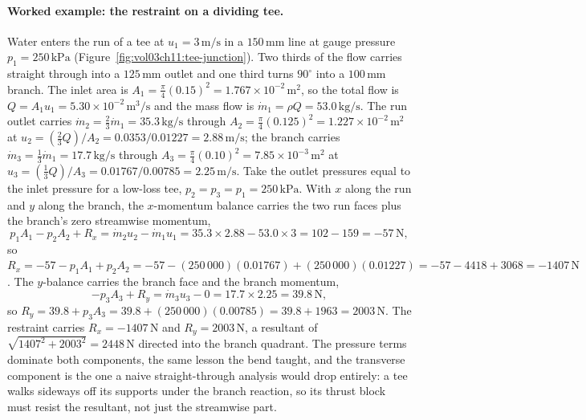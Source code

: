 

\paragraph{Worked example: the restraint on a dividing tee.} Water
enters the run of a tee at $u_1 = 3\,\si{\meter\per\second}$ in a
$150\,\si{\milli\meter}$ line at gauge pressure $p_1 = 250\,\text{kPa}$
(Figure~\ref{fig:vol03ch11:tee-junction}). Two thirds of the flow
carries straight through into a $125\,\si{\milli\meter}$ outlet and one
third turns $90^\circ$ into a $100\,\si{\milli\meter}$ branch. The
inlet area is $A_1 = \tfrac{\pi}{4}(0.15)^2 = 1.767\times
10^{-2}\,\si{\meter}^2$, so the total flow is $Q = A_1 u_1 =
5.30\times 10^{-2}\,\si{\meter\cubed\per\second}$ and the mass flow is
$\dot m_1 = \rho Q = 53.0\,\si{\kilogram\per\second}$. The run outlet
carries $\dot m_2 = \tfrac23\dot m_1 = 35.3\,\si{\kilogram\per\second}$
through $A_2 = \tfrac{\pi}{4}(0.125)^2 = 1.227\times
10^{-2}\,\si{\meter}^2$ at $u_2 = (\tfrac23 Q)/A_2 = 0.0353/0.01227 =
2.88\,\si{\meter\per\second}$; the branch carries $\dot m_3 =
\tfrac13\dot m_1 = 17.7\,\si{\kilogram\per\second}$ through $A_3 =
\tfrac{\pi}{4}(0.10)^2 = 7.85\times 10^{-3}\,\si{\meter}^2$ at $u_3 =
(\tfrac13 Q)/A_3 = 0.01767/0.00785 = 2.25\,\si{\meter\per\second}$.
Take the outlet pressures equal to the inlet pressure for a low-loss
tee, $p_2 = p_3 = p_1 = 250\,\text{kPa}$. With $x$ along the run and
$y$ along the branch, the $x$-momentum balance carries the two run
faces plus the branch's zero streamwise momentum,
\[
p_1 A_1 - p_2 A_2 + R_x = \dot m_2 u_2 - \dot m_1 u_1
= 35.3\times 2.88 - 53.0\times 3 = 102 - 159 = -57\,\si{\newton},
\]
so $R_x = -57 - p_1 A_1 + p_2 A_2 = -57 - (250\,000)(0.01767) +
(250\,000)(0.01227) = -57 - 4418 + 3068 = -1407\,\si{\newton}$. The
$y$-balance carries the branch face and the branch momentum,
\[
-p_3 A_3 + R_y = \dot m_3 u_3 - 0
= 17.7\times 2.25 = 39.8\,\si{\newton},
\]
so $R_y = 39.8 + p_3 A_3 = 39.8 + (250\,000)(0.00785) =
39.8 + 1963 = 2003\,\si{\newton}$. The restraint carries $R_x =
-1407\,\si{\newton}$ and $R_y = 2003\,\si{\newton}$, a resultant of
$\sqrt{1407^2 + 2003^2} = 2448\,\si{\newton}$ directed into the branch
quadrant. The pressure terms dominate both components, the same lesson
the bend taught, and the transverse component is the one a naive
straight-through analysis would drop entirely: a tee walks sideways
off its supports under the branch reaction, so its thrust block must
resist the resultant, not just the streamwise part.

